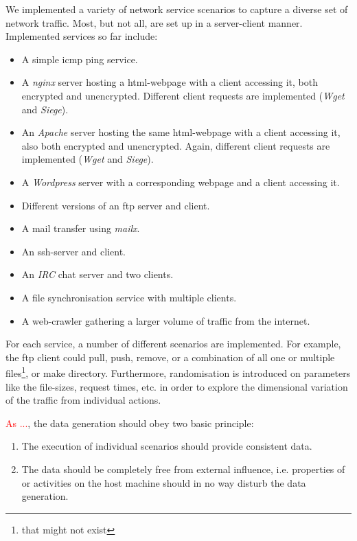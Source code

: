 \documentclass[a4paper,12pt,twoside]{report}
\begin{document}
We implemented a variety of network service  scenarios to capture a diverse set of network traffic. Most, but not all, are set up in a server-client manner. Implemented services so far include:

\begin{itemize}
\item A simple icmp ping service.
\item A \textit{nginx} server hosting a html-webpage with a client accessing it, both encrypted and unencrypted. Different client requests are implemented (\textit{Wget} and \textit{Siege}).
\item An \textit{Apache} server hosting the same html-webpage with a client accessing it, also both encrypted and unencrypted. Again, different client requests are implemented (\textit{Wget} and \textit{Siege}).
\item A \textit{Wordpress} server with a corresponding webpage and a client accessing it.
\item Different versions of an ftp server and client.
\item A mail transfer using \textit{mailx}.
\item An ssh-server and client.
\item An \textit{IRC} chat server and two clients.
\item A file synchronisation service with multiple clients.
\item A web-crawler gathering a larger volume of traffic from the internet.
\end{itemize}

For each service, a number of different scenarios are implemented. For example, the ftp client could pull, push, remove, or a combination of all one or multiple files\footnote{that might not exist}, or make directory. Furthermore, randomisation is introduced on parameters like the file-sizes, request times, etc. in order to explore the dimensional variation of the traffic from individual actions.

\textcolor{red}{As ...}, the data generation should obey two basic principle: 
\begin{enumerate}
\item The execution of individual scenarios should provide consistent data. 

\item The data should be completely free from external influence, i.e. properties of or activities on the host machine should in no way disturb the data generation.
\end{enumerate}
\end{document}

